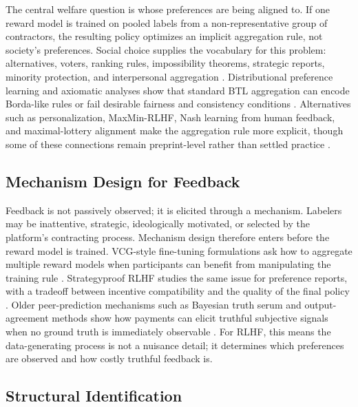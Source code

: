 The central welfare question is whose preferences are being aligned to. If one reward model is trained on pooled labels from a non-representative group of contractors, the resulting policy optimizes an implicit aggregation rule, not society's preferences. Social choice supplies the vocabulary for this problem: alternatives, voters, ranking rules, impossibility theorems, strategic reports, minority protection, and interpersonal aggregation \citep{conitzer2024socialchoice,mishra2023socialchoice}. Distributional preference learning and axiomatic analyses show that standard BTL aggregation can encode Borda-like rules or fail desirable fairness and consistency conditions \citep{siththaranjan2024distributional,ge2024axioms}. Alternatives such as personalization, MaxMin-RLHF, Nash learning from human feedback, and maximal-lottery alignment make the aggregation rule more explicit, though some of these connections remain preprint-level rather than settled practice \citep{park2024heterogeneous,chakraborty2024maxmin,munos2023nash,maurarivero2025maximal}.

\subsection{Mechanism Design for Feedback}

Feedback is not passively observed; it is elicited through a mechanism. Labelers may be inattentive, strategic, ideologically motivated, or selected by the platform's contracting process. Mechanism design therefore enters before the reward model is trained. VCG-style fine-tuning formulations ask how to aggregate multiple reward models when participants can benefit from manipulating the training rule \citep{sun2024mechanism}. Strategyproof RLHF studies the same issue for preference reports, with a tradeoff between incentive compatibility and the quality of the final policy \citep{kleinebuening2025strategyproof}. Older peer-prediction mechanisms such as Bayesian truth serum and output-agreement methods show how payments can elicit truthful subjective signals when no ground truth is immediately observable \citep{prelec2004bayesian,miller2005eliciting}. For RLHF, this means the data-generating process is not a nuisance detail; it determines which preferences are observed and how costly truthful feedback is.

\subsection{Structural Identification}

